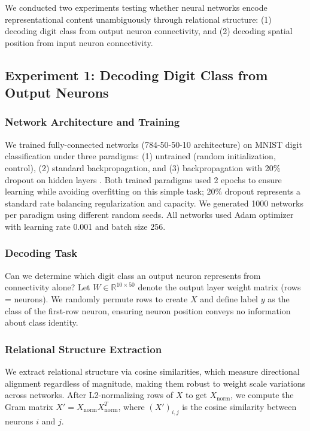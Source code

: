 We conducted two experiments testing whether neural networks encode representational content unambiguously through relational structure: (1) decoding digit class from output neuron connectivity, and (2) decoding spatial position from input neuron connectivity.

\subsection{Experiment 1: Decoding Digit Class from Output Neurons}

\subsubsection{Network Architecture and Training}

We trained fully-connected networks (784-50-50-10 architecture) on MNIST digit classification under three paradigms: (1) untrained (random initialization, control), (2) standard backpropagation, and (3) backpropagation with 20\% dropout on hidden layers \citep{baldi2013understanding}. Both trained paradigms used 2 epochs to ensure learning while avoiding overfitting on this simple task; 20\% dropout represents a standard rate balancing regularization and capacity. We generated 1000 networks per paradigm using different random seeds. All networks used Adam optimizer with learning rate 0.001 and batch size 256.

\subsubsection{Decoding Task}

Can we determine which digit class an output neuron represents from connectivity alone? Let $W \in \mathbb{R}^{10 \times 50}$ denote the output layer weight matrix (rows = neurons). We randomly permute rows to create $X$ and define label $y$ as the class of the first-row neuron, ensuring neuron position conveys no information about class identity.

\subsubsection{Relational Structure Extraction}

We extract relational structure via cosine similarities, which measure directional alignment regardless of magnitude, making them robust to weight scale variations across networks. After L2-normalizing rows of $X$ to get $X_{\text{norm}}$, we compute the Gram matrix $X' = X_{\text{norm}} X_{\text{norm}}^T$, where $(X')_{i,j}$ is the cosine similarity between neurons $i$ and $j$.

